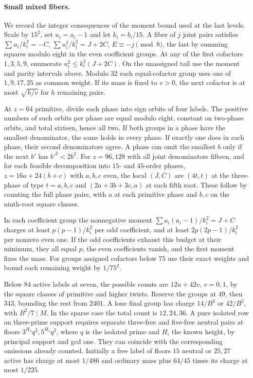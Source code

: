 \documentclass[11pt]{amsart}
\numberwithin{equation}{section}
\theoremstyle{definition}
\theoremstyle{plain}
\begin{document}
\paragraph{Small mixed fibers.}
We record the integer consequences of the moment bound used at the last
levels. Scale by $15^2$, set $u_i=a_i-1$ and let $k_i=b_i/15$.
A fiber of $j$ joint pairs satisfies
$\sum u_i/k_i^2=-C$, $\sum u_i^2/k_i^2=J+2C$, $E\equiv-j\pmod8$,
the last by summing squares modulo eight in the even coefficient groups.
At any of the first cofactors $1,3,5,9$, enumerate
$u_i^2\le k_i^2(J+2C)$. On the unassigned tail use the moment and parity
intervals above. Modulo $32$ each equal-cofactor group uses one of
$1,9,17,25$ as common weight. If its mass is fixed to $v>0$, the next
cofactor is at most $\sqrt{h/v}$ for $h$ remaining pairs.

At $z=64$ primitive, divide each phase into sign orbits of four labels.
The positive numbers of such orbits per phase are equal modulo eight,
constant on two-phase orbits, and total sixteen, hence all two. If both
groups in a phase have the smallest denominator, the same holds in
every phase. If exactly one does in each phase, their second denominators
agree. A phase can omit the smallest $b$ only if the next $b'$ has
$b'^2<2b^2$. For $z=96,128$ with all joint denominators fifteen, and for each feasible decomposition into $15$- and $45$-order phases,
$z=16a+24(b+c)$ with $a,b,c$ even, the local $(J,C)$ are $(4t,t)$
at the three-phase of type $t=a,b,c$ and $(2a+3b+3c,a)$ at each fifth
root. These follow by counting the full phase pairs, with $a$ at each
primitive phase and $b,c$ on the ninth-root square classes.

In each coefficient group the nonnegative moment
$\sum a_i(a_i-1)/k_i^2=J+C$ charges at least $p(p-1)/k_i^2$ per
odd coefficient, and at least $2p(2p-1)/k_i^2$ per nonzero even one.
If the odd coefficients exhaust this budget at their minimum, they
all equal $p$, the even coefficients vanish, and the first moment fixes
the mass. For groups assigned cofactors below $75$ use their exact
weights and bound each remaining weight by $1/75^2$.

Below $84$ active labels at seven, the possible counts are
$12u+42v$, $v=0,1$, by the square classes of primitive and higher twists.
Reserve the groups at $49$, then $343$, bounding the rest from $2401$.
A lone final group has charge $14/B^2$ or $42/B^2$, with $B^2/7\mid M$.
In the sparse case the total count is $12,24,36$. A pure isolated row
on three-prime support requires separate three-free and five-free neutral
pairs at floors $3^{H_3}q^2,5^{H_5}q^2$, where $q$ is the isolated
prime and $H_i$ the known height, by principal support and gcd one.
They can coincide with the corresponding omissions already counted.
Initially a free label of floors $15$ neutral or $25,27$ active has
charge at most $1/486$ and ordinary mass plus $64/45$ times its charge
at most $1/225$.
\end{document}
